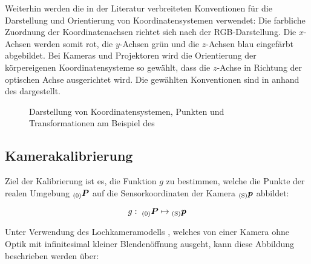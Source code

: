Weiterhin werden die in der Literatur verbreiteten Konventionen für die Darstellung und Orientierung von Koordinatensystemen verwendet: Die farbliche Zuordnung der Koordinatenachsen richtet sich nach der RGB-Darstellung. Die $x$-Achsen werden somit rot, die $y$-Achsen grün und die $z$-Achsen blau eingefärbt abgebildet. Bei Kameras und Projektoren wird die Orientierung der körpereigenen Koordinatensysteme so gewählt, dass die $z$-Achse in Richtung der optischen Achse ausgerichtet wird. Die gewählten Konventionen sind in  anhand des  dargestellt.

\begin{figure}[ht]
	\begin{center}%
		\caption{Darstellung von Koordinatensystemen, Punkten und Transformationen am Beispiel des }
		\label{fig.coords}
	\end{center}
\end{figure}

\prever{
}

\subsection{Kamerakalibrierung}
\label{chap.calib}
Ziel der Kalibrierung ist es, die Funktion $g$ zu bestimmen, welche die Punkte der realen Umgebung ${_{{\mathrm{(0)}}}}\mbox{\boldmath{$P$}}$ auf die Sensorkoordinaten der Kamera ${_{{\mathrm{(S)}}}}\mbox{\boldmath{$p$}}$ abbildet:

\begin{equation}
g : \; {_{{\mathrm{(0)}}}}\mbox{\boldmath{$P$}} \mapsto {_{{\mathrm{(S)}}}}\mbox{\boldmath{$p$}}
\end{equation}


\prever{
}
Unter Verwendung des Lochkameramodells \cite{Jaehne2012}, welches von einer Kamera ohne Optik mit infinitesimal kleiner Blendenöffnung ausgeht, kann diese Abbildung beschrieben werden über:

